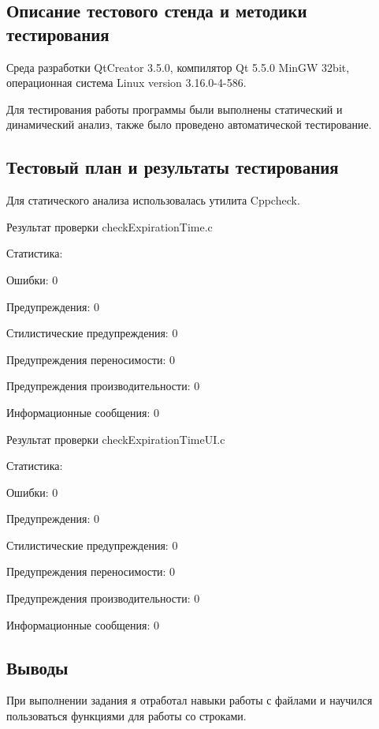 \documentclass[12pt,a4paper]{report}
\begin{document}
	
\subsection{Описание тестового стенда и методики тестирования}
Среда разработки QtCreator 3.5.0, компилятор Qt 5.5.0 MinGW 32bit, операционная система Linux version 3.16.0-4-586.

Для тестирования работы программы были выполнены статический и динамический анализ, также было проведено автоматической тестирование.
\subsection{Тестовый план и результаты тестирования}

Для статического анализа использовалась утилита Cppcheck.

\vspace{\baselineskip}
Результат проверки checkExpirationTime.c 

Статистика:

Ошибки:	0

Предупреждения:	0

Стилистические предупреждения:	0

Предупреждения переносимости:	0

Предупреждения производительности:	0

Информационные сообщения:	0


\vspace{\baselineskip}


Результат проверки checkExpirationTimeUI.c 

Статистика:

Ошибки:	0

Предупреждения:	0

Стилистические предупреждения:	0

Предупреждения переносимости:	0

Предупреждения производительности:	0

Информационные сообщения:	0





\vspace{\baselineskip}

\subsection{Выводы}

При выполнении задания я отработал навыки работы с файлами и научился пользоваться функциями для работы со строками.
\end{document}
